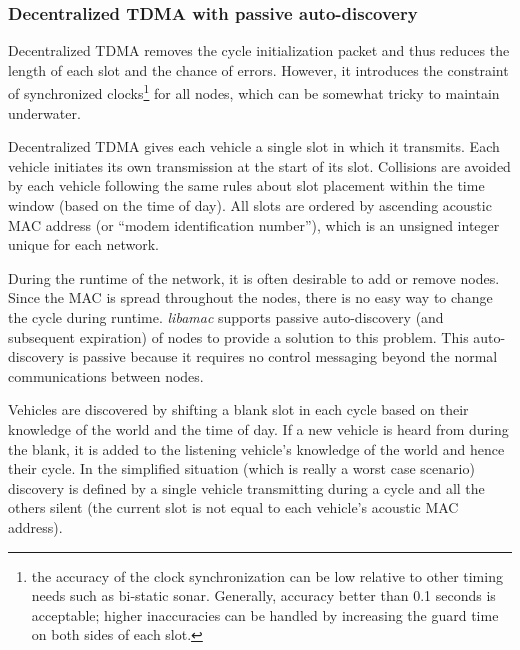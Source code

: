 \subsubsection{Decentralized TDMA with passive auto-discovery}

Decentralized TDMA removes the cycle initialization packet and thus reduces the length of each slot and the chance of errors. However, it introduces the constraint of synchronized clocks\footnote{the accuracy of the clock synchronization can be  low relative to other timing needs such as bi-static sonar. Generally, accuracy better than 0.1 seconds is acceptable; higher inaccuracies can be handled by increasing the guard time on both sides of each slot.} for all nodes, which can be somewhat tricky to maintain underwater.

Decentralized TDMA gives each vehicle a single slot in which it transmits. Each vehicle initiates its own transmission at the start of its slot. Collisions are avoided by each vehicle following the same rules about slot placement within the time window (based on the time of day). All slots are ordered by ascending acoustic MAC address (or ``modem identification number''), which is an unsigned integer unique for each network.

During the runtime of the network, it is often desirable to add or remove nodes. Since the MAC is spread throughout the nodes, there is no easy way to change the cycle during runtime. \textit{libamac} supports passive auto-discovery (and subsequent expiration) of nodes to provide a solution to this problem. This auto-discovery is passive because it requires no control messaging beyond the normal communications between nodes.

Vehicles are discovered by shifting a blank slot in each cycle based on their knowledge of the world and the time of day. If a new vehicle is heard from during the blank, it is added to the listening vehicle's knowledge of the world and hence their cycle. In the simplified situation (which is really a worst case scenario) discovery is defined by a single vehicle transmitting during a cycle and all the others silent (the current slot is not equal to each vehicle's acoustic MAC address).

